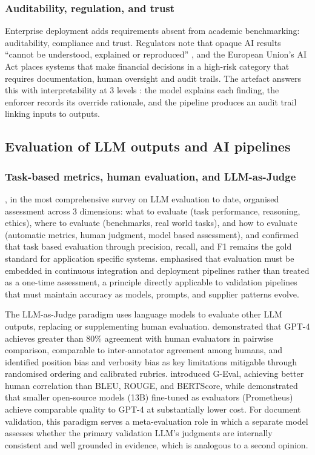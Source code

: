 \subsubsection{Auditability, regulation, and trust}

Enterprise deployment adds requirements absent from academic benchmarking: auditability, compliance and trust. Regulators note that opaque AI results ``cannot be understood, explained or reproduced'' \citep{perezcruz2025,finma2024}, and the European Union's AI Act \citep{euaiact2024} places systems that make financial decisions in a high-risk category that requires documentation, human oversight and audit trails. The artefact answers this with interpretability at 3 levels \citep{ramachandram2025}: the model explains each finding, the enforcer records its override rationale, and the pipeline produces an audit trail linking inputs to outputs.


\subsection{Evaluation of LLM outputs and AI pipelines}
\label{sec:lr:eval}

\subsubsection{Task-based metrics, human evaluation, and LLM-as-Judge}

\citet{chang2024}, in the most comprehensive survey on LLM evaluation to date, organised assessment across 3 dimensions: what to evaluate (task performance, reasoning, ethics), where to evaluate (benchmarks, real world tasks), and how to evaluate (automatic metrics, human judgment, model based assessment), and confirmed that task based evaluation through precision, recall, and F1 remains the gold standard for application specific systems. \citet{rudd2025} emphasised that evaluation must be embedded in continuous integration and deployment pipelines rather than treated as a one-time assessment, a principle directly applicable to validation pipelines that must maintain accuracy as models, prompts, and supplier patterns evolve.

The LLM-as-Judge paradigm uses language models to evaluate other LLM outputs, replacing or supplementing human evaluation. \citet{zheng2023} demonstrated that GPT-4 achieves greater than 80\% agreement with human evaluators in pairwise comparison, comparable to inter-annotator agreement among humans, and identified position bias and verbosity bias as key limitations mitigable through randomised ordering and calibrated rubrics. \citet{liu2023geval} introduced G-Eval, achieving better human correlation than BLEU, ROUGE, and BERTScore, while \citet{kim2024} demonstrated that smaller open-source models (13B)
fine-tuned as evaluators (Prometheus) achieve comparable quality to
GPT-4 at substantially lower cost. For document validation, this paradigm serves a meta-evaluation role in which a separate model assesses whether the primary validation LLM's judgments are internally consistent and well grounded in evidence, which is analogous to a second opinion.

